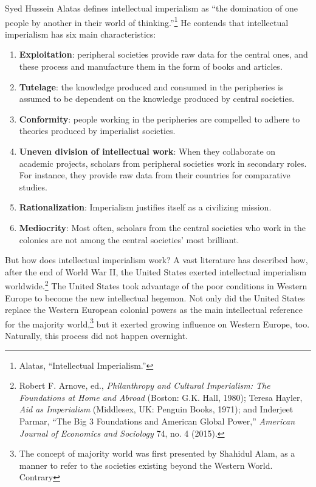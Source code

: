 \documentclass{tufte-handout}
\begin{document}
Syed Hussein Alatas defines intellectual imperialism as ``the domination
of one people by another in their world of thinking.''\footnote{Alatas,
  ``Intellectual Imperialism.''} He contends that intellectual
imperialism has six main characteristics:

\begin{enumerate}
\item
  \textbf{Exploitation}: peripheral societies provide raw data for the
  central ones, and these process and manufacture them in the form of
  books and articles.
\item
  \textbf{Tutelage}: the knowledge produced and consumed in the
  peripheries is assumed to be dependent on the knowledge produced by
  central societies.
\item
  \textbf{Conformity}: people working in the peripheries are compelled
  to adhere to theories produced by imperialist societies.
\item
  \textbf{Uneven division of intellectual work}: When they collaborate
  on academic projects, scholars from peripheral societies work in
  secondary roles. For instance, they provide raw data from their
  countries for comparative studies.
\item
  \textbf{Rationalization}: Imperialism justifies itself as a civilizing
  mission.
\item
  \textbf{Mediocrity}: Most often, scholars from the central societies
  who work in the colonies are not among the central societies' most
  brilliant.
\end{enumerate}

But how does intellectual imperialism work? A vast literature has
described how, after the end of World War II, the United States exerted
intellectual imperialism worldwide.\footnote{Robert F. Arnove, ed.,
  \emph{Philanthropy and Cultural Imperialism: The Foundations at Home
  and Abroad} (Boston: G.K. Hall, 1980); Teresa Hayler, \emph{Aid as
  Imperialism} (Middlesex, UK: Penguin Books, 1971); and Inderjeet
  Parmar, ``The Big 3 Foundations and American Global Power,''
  \emph{American Journal of Economics and Sociology} 74, no. 4 (2015).}
The United States took advantage of the poor conditions in Western
Europe to become the new intellectual hegemon. Not only did the United
States replace the Western European colonial powers as the main
intellectual reference for the majority world,\footnote{The concept of
  majority world was first presented by Shahidul Alam, as a manner to
  refer to the societies existing beyond the Western World. Contrary} but it exerted growing influence on
Western Europe, too. Naturally, this process did not happen overnight.
\end{document}
